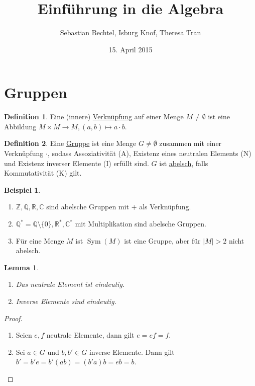 \documentclass[12pt]{scrartcl}%
\newtheorem{lemma}{Lemma}
\theoremstyle{definition}
\newtheorem*{defn}{Definition}
\newtheorem{ex}{Beispiel}
\theoremstyle{remark}
\DeclareMathOperator{\sym}{Sym}
\begin{document}
\author{Sebastian Bechtel, Isburg Knof, Theresa Tran}
\title{Einführung in die Algebra}
\date{15. April 2015}

\maketitle

\section{Gruppen}

\begin{defn}
    Eine (innere) \underline{Verknüpfung} auf einer Menge $M\neq \emptyset$ ist eine Abbildung $M\times M\to M, (a,b)\mapsto a\cdot b$.
\end{defn}

\begin{defn}
    Eine \underline{Gruppe} ist eine Menge $G\neq \emptyset$ zusammen mit einer Verknüpfung $\cdot$, sodass Assoziativität (A), Existenz eines neutralen Elements (N) und Existenz inverser Elemente (I) erfüllt sind. $G$ ist \underline{abelsch}, falls Kommutativität (K) gilt.
\end{defn}

\begin{ex}
    \begin{enumerate}
        \item $\mathbb{Z}, \mathbb{Q}, \mathbb{R}, \mathbb{C}$ sind abelsche Gruppen mit $+$ als Verknüpfung.
        \item $\mathbb{Q}^*=\mathbb{Q}\setminus \{0\}, \mathbb{R}^*, \mathbb{C}^*$ mit Multiplikation sind abelsche Gruppen.
        \item Für eine Menge $M$ ist $\sym(M)$ ist eine Gruppe, aber für $|M| > 2$ nicht abelsch.
    \end{enumerate}
\end{ex}

\begin{lemma}
    \begin{enumerate}[label=\alph*)]
        \item Das neutrale Element ist eindeutig.
        \item Inverse Elemente sind eindeutig.
    \end{enumerate}
\end{lemma}

\begin{proof}
    \begin{enumerate}[label=\alph*)]
        \item Seien $e,f$ neutrale Elemente, dann gilt $e=ef=f$.
        \item Sei $a\in G$ und $b,b'\in G$ inverse Elemente. Dann gilt $b'=b'e=b'(ab)=(b'a)b=eb=b$. 
    \end{enumerate}
\end{proof}
\end{document}
